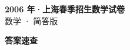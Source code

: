 \documentclass[zihao=-4, a4paper]{ctexart}
\begin{document}
\begin{center}
  {\Large\bfseries 2006 年·上海春季招生数学试卷}\\[4pt]
  {\large 数学 · 简答版}
\end{center}
\medskip
{}

\clearpage
{}
\begin{center}{\Large\bfseries 答案速查}\end{center}
\medskip

\end{document}
